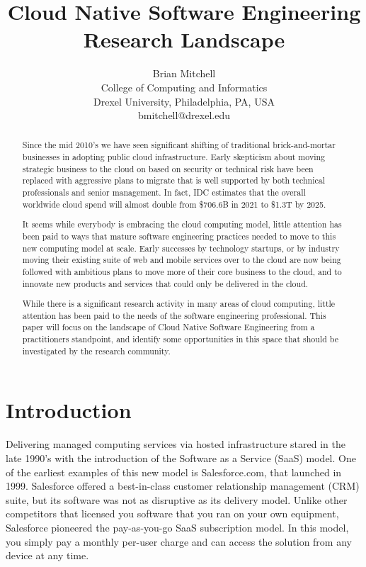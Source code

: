 \documentclass[conference]{IEEEconf}
\title{ 
        	Cloud Native Software Engineering Research Landscape
      }
\author{
			Brian Mitchell\\
			College of Computing and Informatics\\
			Drexel University, Philadelphia, PA, USA\\
			bmitchell@drexel.edu
}
\date{}
\begin{document}
%

\maketitle

\thispagestyle{empty}


\begin{abstract}
Since the mid 2010's we have seen significant shifting of traditional brick-and-mortar businesses in adopting public cloud infrastructure.  Early skepticism about moving strategic business to the cloud on based on security or technical risk have been replaced with aggressive plans to migrate that is well supported by both technical professionals and senior management. In fact, IDC estimates that the overall worldwide cloud spend will almost double from \$706.6B in 2021 to \$1.3T by 2025\cite{IDCReport}.  

It seems while everybody is embracing the cloud computing model, little attention has been paid to ways that mature software engineering practices needed to move to this new computing model at scale. Early successes by technology startups, or by industry moving their existing suite of web and mobile services over to the cloud are now being followed with ambitious plans to move more of their core business to the cloud, and to innovate new products and services that could only be delivered in the cloud.

While there is a significant research activity in many areas of cloud computing, little attention has been paid to the needs of the software engineering professional.  This paper will focus on the landscape of Cloud Native Software Engineering from a practitioners standpoint, and  identify some opportunities in this space that should be investigated by the research community.
\end{abstract}  

\section{Introduction}
\label{Intro}
Delivering managed computing services via hosted infrastructure stared in the late 1990's with the introduction of the Software as a Service (SaaS) model. One of the earliest examples of this new model is Salesforce.com, that launched in 1999\cite{SalesforceHistory}.  Salesforce offered a best-in-class customer relationship management (CRM) suite, but its software was not as disruptive as its delivery model. Unlike other competitors that licensed you software that you ran on your own equipment, Salesforce pioneered the pay-as-you-go SaaS subscription model. In this model, you simply pay a monthly per-user charge and can access the solution from any device at any time.     
\end{document}
